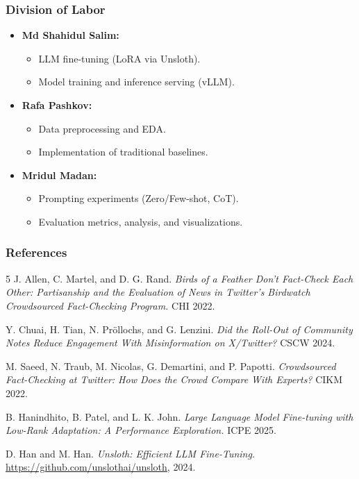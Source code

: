 \documentclass[11pt]{beamer}
\begin{document}
\begin{frame}
    \frametitle{Division of Labor}
    \begin{itemize}
        \item \textbf{Md Shahidul Salim:}
        \begin{itemize}
            \item LLM fine-tuning (LoRA via Unsloth).
            \item Model training and inference serving (vLLM).
        \end{itemize}
        \vspace{0.3cm}
        \item \textbf{Rafa Pashkov:}
        \begin{itemize}
            \item Data preprocessing and EDA.
            \item Implementation of traditional baselines.
        \end{itemize}
        \vspace{0.3cm}
        \item \textbf{Mridul Madan:}
        \begin{itemize}
            \item Prompting experiments (Zero/Few-shot, CoT).
            \item Evaluation metrics, analysis, and visualizations.
        \end{itemize}
    \end{itemize}
\end{frame}

\begin{frame}[allowframebreaks]
    \frametitle{References}
    \begin{thebibliography}{5}
        J. Allen, C. Martel, and D. G. Rand.
        \newblock \emph{Birds of a Feather Don't Fact-Check Each Other: Partisanship and the Evaluation of News in Twitter's Birdwatch Crowdsourced Fact-Checking Program.}
        \newblock CHI 2022.

        Y. Chuai, H. Tian, N. Pr\"{o}llochs, and G. Lenzini.
        \newblock \emph{Did the Roll-Out of Community Notes Reduce Engagement With Misinformation on X/Twitter?}
        \newblock CSCW 2024.

        M. Saeed, N. Traub, M. Nicolas, G. Demartini, and P. Papotti.
        \newblock \emph{Crowdsourced Fact-Checking at Twitter: How Does the Crowd Compare With Experts?}
        \newblock CIKM 2022.

        B. Hanindhito, B. Patel, and L. K. John.
        \newblock \emph{Large Language Model Fine-tuning with Low-Rank Adaptation: A Performance Exploration.}
        \newblock ICPE 2025.

        D. Han and M. Han.
        \newblock \emph{Unsloth: Efficient LLM Fine-Tuning.}
        \newblock \url{https://github.com/unslothai/unsloth}, 2024.
    \end{thebibliography}
\end{frame}
\end{document}
